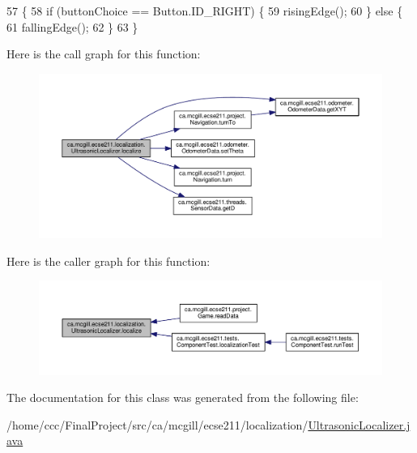 \begin{DoxyCode}
57                                          \{
58     \textcolor{keywordflow}{if} (buttonChoice == Button.ID\_RIGHT) \{
59       risingEdge();
60     \} \textcolor{keywordflow}{else} \{
61       fallingEdge();
62     \}
63   \}
\end{DoxyCode}
Here is the call graph for this function\+:\nopagebreak
\begin{figure}[H]
\begin{center}
\leavevmode
\includegraphics[width=350pt]{classca_1_1mcgill_1_1ecse211_1_1localization_1_1_ultrasonic_localizer_ab78196997d7409aec0c35603686989ad_cgraph}
\end{center}
\end{figure}
Here is the caller graph for this function\+:
\nopagebreak
\begin{figure}[H]
\begin{center}
\leavevmode
\includegraphics[width=350pt]{classca_1_1mcgill_1_1ecse211_1_1localization_1_1_ultrasonic_localizer_ab78196997d7409aec0c35603686989ad_icgraph}
\end{center}
\end{figure}


The documentation for this class was generated from the following file\+:\begin{DoxyCompactItemize}
\item 
/home/ccc/\+Final\+Project/src/ca/mcgill/ecse211/localization/\hyperlink{_ultrasonic_localizer_8java}{Ultrasonic\+Localizer.\+java}\end{DoxyCompactItemize}
